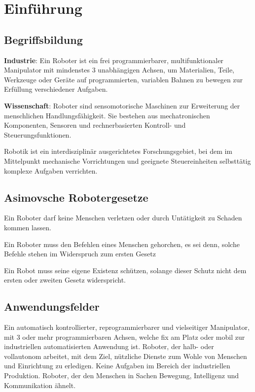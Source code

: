 \chapter{Einführung}

\section{Begriffsbildung}

\begin{compactitem}
    \item \textbf{Industrie}: Ein Roboter ist ein frei programmierbarer, multifunktionaler
    Manipulator mit mindenstes 3 unabhängigen Achsen, um Materialien, Teile, Werkzeuge oder
    Geräte auf programmierten, variablen Bahnen zu bewegen zur Erfüllung verschiedener Aufgaben.
    \item \textbf{Wissenschaft}: Roboter sind sensomotorische Maschinen zur Erweiterung der
    menschlichen Handlungsfähigkeit. Sie bestehen aus mechatronischen Komponenten, Sensoren und
    rechnerbasierten Kontroll- und Steuerungsfunktionen.
\end{compactitem}

Robotik ist ein interdisziplinär ausgerichtetes Forschungsgebiet, bei dem im Mittelpunkt mechanische
Vorrichtungen und geeignete Steuereinheiten selbsttätig komplexe Aufgaben verrichten.

\section{Asimovsche Robotergesetze}
\begin{compactenum}
    \item Ein Roboter darf keine Menschen verletzen oder durch Untätigkeit zu Schaden kommen lassen.
    \item Ein Roboter muss den Befehlen eines Menschen gehorchen, es sei denn, solche Befehle stehen
    im Widerspruch zum ersten Gesetz
    \item Ein Robot muss seine eigene Existenz schützen, solange dieser Schutz nicht dem ersten oder
    zweiten Gesetz widerspricht.
\end{compactenum}

\section{Anwendungsfelder}
Ein automatisch kontrollierter, reprogrammierbarer und vielseitiger Manipulator, mit 3 oder mehr
programmierbaren Achsen, welche fix am Platz oder mobil zur industriellen automatisierten
Anwendung ist.
Roboter, der halb- oder vollautonom arbeitet, mit dem Ziel, nützliche Dienste zum Wohle von Menschen
und Einrichtung zu erledigen. Keine Aufgaben im Bereich der industriellen Produktion.
Roboter, der den Menschen in Sachen Bewegung, Intelligenz und Kommunikation ähnelt.
